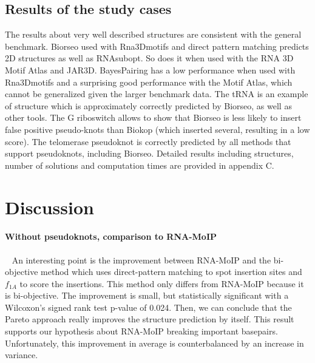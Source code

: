 \documentclass{bioinfo}
\begin{document}
\subsection{Results of the study cases}
The results about very well described structures are consistent with the general benchmark. Biorseo used with Rna3Dmotifs and direct pattern matching predicts 2D structures as well as RNAsubopt. So does it when used with the RNA 3D Motif Atlas and JAR3D. BayesPairing has a low performance when used with Rna3Dmotifs and a surprising good performance with the Motif Atlas, which cannot be generalized given the larger benchmark data.
The tRNA is an example of structure which is approximately correctly predicted by Biorseo, as well as other tools. The G riboswitch allows to show that Biorseo is less likely to insert false positive pseudo-knots than Biokop (which inserted several, resulting in a low score). 
The telomerase pseudoknot is correctly predicted by all methods that support pseudoknots, including Biorseo. 
Detailed results including structures, number of solutions and computation times are provided in appendix C. 

\section{Discussion}

\paragraph{Without pseudoknots, comparison to RNA-MoIP} ~  An interesting point is the improvement between RNA-MoIP and the bi-objective method which uses direct-pattern matching to spot insertion sites and $f_{1A}$ to score the insertions. This method only differs from RNA-MoIP because it is bi-objective. The improvement is small, but statistically significant with a Wilcoxon's signed rank test p-value of 0.024. Then, we can conclude that the Pareto approach really improves the structure prediction by itself. This result supports our hypothesis about RNA-MoIP breaking important basepairs. Unfortunately, this improvement in average is counterbalanced by an increase in variance.
\end{document}
